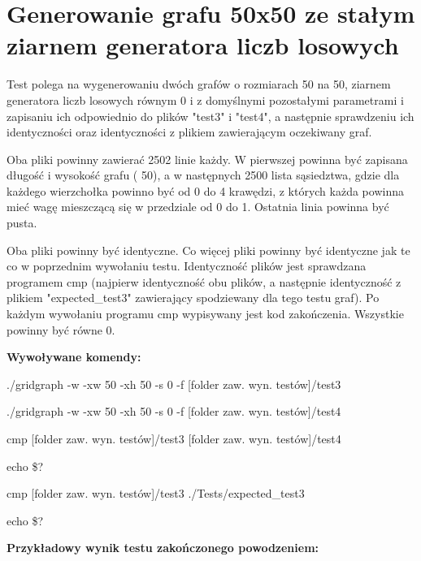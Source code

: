 \documentclass[11pt,a4paper]{report}
\def\console #1{\begingroup\fontfamily{qcr}\selectfont#1\endgroup}
\newenvironment{multiconsole}{\begingroup\fontfamily{qcr}\selectfont}{\endgroup}
\begin{document}
    \newpage
    \section{Generowanie grafu 50x50 ze stałym ziarnem generatora liczb losowych}

    Test polega na wygenerowaniu dwóch grafów o rozmiarach 50 na 50, ziarnem generatora liczb losowych równym 0 i z domyślnymi pozostałymi parametrami i zapisaniu ich odpowiednio do plików "test3" i "test4", a następnie sprawdzeniu ich identyczności oraz identyczności z plikiem zawierającym oczekiwany graf. 
    
    Oba pliki powinny zawierać 2502 linie każdy. W pierwszej powinna być zapisana długość i wysokość grafu (\console{50 50}), a w następnych 2500 lista sąsiedztwa, gdzie dla każdego wierzchołka powinno być od 0 do 4 krawędzi, z których każda powinna mieć wagę mieszczącą się w przedziale od 0 do 1. Ostatnia linia powinna być pusta. 
    
    Oba pliki powinny być identyczne. Co więcej pliki powinny być identyczne jak te co w poprzednim wywołaniu testu. Identyczność plików jest sprawdzana programem \console{cmp} (najpierw identyczność obu plików, a następnie identyczność z plikiem "expected\_test3" zawierający spodziewany dla tego testu graf). Po każdym wywołaniu programu \console{cmp} wypisywany jest kod zakończenia. Wszystkie powinny być równe 0.

    \vspace{2em}

    \textbf{Wywoływane komendy:}

    \vspace{1em}

    \begin{multiconsole}
        ./gridgraph -w -xw 50 -xh 50 -s 0 -f [folder zaw. wyn. testów]/test3

        ./gridgraph -w -xw 50 -xh 50 -s 0 -f [folder zaw. wyn. testów]/test4

        cmp [folder zaw. wyn. testów]/test3 [folder zaw. wyn. testów]/test4

        echo \$?

        cmp [folder zaw. wyn. testów]/test3 ./Tests/expected\_test3

        echo \$?
    \end{multiconsole}

    \vspace{2em}

    \textbf{Przykładowy wynik testu zakończonego powodzeniem:}
\end{document}
